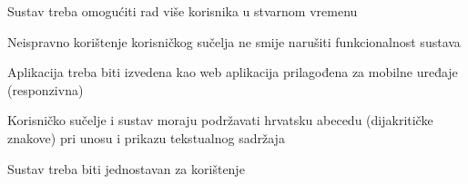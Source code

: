 \begin{packed_item}
	\item Sustav treba omogućiti rad više korisnika u stvarnom vremenu
	\item Neispravno korištenje korisničkog sučelja ne smije narušiti funkcionalnost sustava
	\item Aplikacija treba biti izvedena kao web aplikacija prilagođena za mobilne uređaje (responzivna)
	\item Korisničko sučelje i sustav moraju podržavati hrvatsku abecedu (dijakritičke znakove) pri unosu i prikazu tekstualnog sadržaja
	\item Sustav treba biti jednostavan za korištenje
	
\end{packed_item}

